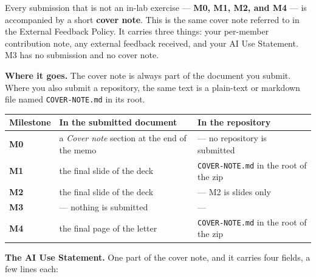 \documentclass[
]{article}
\newcounter{none} %
\begin{document}
Every submission that is not an in-lab exercise --- \textbf{M0, M1, M2,
and M4} --- is accompanied by a short \textbf{cover note}. This is the
same cover note referred to in the External Feedback Policy. It carries
three things: your per-member contribution note, any external feedback
received, and your AI Use Statement. M3 has no submission and no cover
note.

\textbf{Where it goes.} The cover note is always part of the document
you submit. Where you also submit a repository, the same text is a
plain-text or markdown file named \texttt{COVER-NOTE.md} in its root.

{\def\LTcaptype{none} %
\begin{longtable}[]{@{}
  >{\raggedright\arraybackslash}p{}
  >{\raggedright\arraybackslash}p{}
  >{\raggedright\arraybackslash}p{}@{}}
\toprule\noalign{}
\begin{minipage}[b]{\linewidth}\raggedright
Milestone
\end{minipage} & \begin{minipage}[b]{\linewidth}\raggedright
In the submitted document
\end{minipage} & \begin{minipage}[b]{\linewidth}\raggedright
In the repository
\end{minipage} \\
\midrule\noalign{}
\endhead
\bottomrule\noalign{}
\endlastfoot
\textbf{M0} & a \emph{Cover note} section at the end of the memo & ---
no repository is submitted \\
\textbf{M1} & the final slide of the deck & \texttt{COVER-NOTE.md} in
the root of the zip \\
\textbf{M2} & the final slide of the deck & --- M2 is slides only \\
\textbf{M3} & --- nothing is submitted & --- \\
\textbf{M4} & the final page of the letter & \texttt{COVER-NOTE.md} in
the root of the zip \\
\end{longtable}
}

\textbf{The AI Use Statement.} One part of the cover note, and it
carries four fields, a few lines each:
\end{document}
